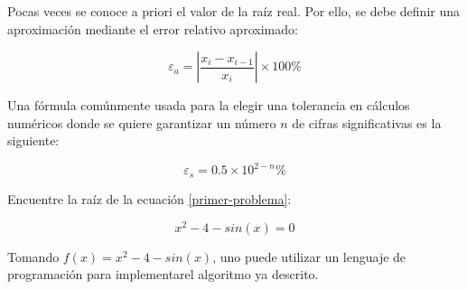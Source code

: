 Pocas veces se conoce a priori el valor de la raíz real. Por ello, se
debe definir una aproximación mediante el error relativo aproximado:

\[
	\varepsilon_a = \left| \frac{x_i - x_{i-1}}{x_i} \right| \times 100\%
\]

Una fórmula comúnmente usada para la elegir una tolerancia en cálculos numéricos
donde se quiere garantizar un número $n$ de cifras significativas es la
siguiente:

\[
	\varepsilon_s = 0.5 \times 10^{2-n} \%
\]

\begin{ex}

	Encuentre la raíz de la ecuación \ref{primer-problema}:

	\[
		x^2 - 4 - sin(x) = 0
	\]

	\begin{solution}
		Tomando $f(x) = x^2 - 4 - sin(x)$, uno puede utilizar un
		lenguaje de programación para implementarel algoritmo ya
		descrito.

		
	\end{solution}
	
\end{ex}
